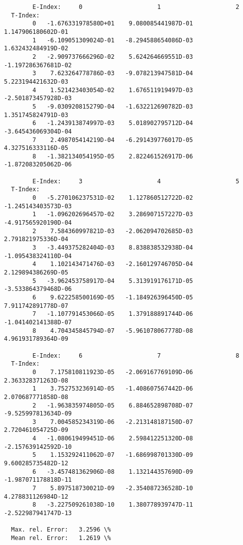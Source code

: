 \documentclass[12pt,dvipdfmx]{article}
\begin{document}
{\begin{small}\begin{verbatim}
        E-Index:     0                     1                     2
  T-Index:
        0   -1.676331978580D+01    9.080085441987D-01    1.147906180602D-01
        1   -6.109051309024D-01   -8.294588654086D-03    1.632432484919D-02
        2   -2.909737666296D-02    5.624264669551D-03   -1.197286367681D-02
        3    7.623264778786D-03   -9.078213947581D-04    5.223194421632D-03
        4    1.521423403054D-02    1.676511919497D-03   -2.501873457928D-03
        5   -9.030920815279D-04   -1.632212690782D-03    1.351745824791D-03
        6   -1.243913874997D-03    5.018902795712D-04   -3.645436069304D-04
        7    2.498705414219D-04   -6.291439776017D-05    4.327516333116D-05
        8   -1.382134054195D-05    2.822461526917D-06   -1.872083205062D-06

        E-Index:     3                     4                     5
  T-Index:
        0   -5.270106237531D-02    1.127860512722D-02   -1.245143403573D-03
        1   -1.096202696457D-02    3.286907157227D-03   -4.917565920190D-04
        2    7.584360997821D-03   -2.062094702685D-03    2.791821975336D-04
        3   -3.449375282404D-03    8.838838532938D-04   -1.095438324110D-04
        4    1.102143471476D-03   -2.160129746705D-04    2.129894386269D-05
        5   -3.962453758917D-04    5.313919176171D-05   -3.533864379468D-06
        6    9.622258500169D-05   -1.184926396450D-05    7.911742891778D-07
        7   -1.107791453066D-05    1.379188891744D-06   -1.041402141388D-07
        8    4.704345845794D-07   -5.961078067778D-08    4.961931789364D-09

        E-Index:     6                     7                     8
  T-Index:
        0    7.175810811923D-05   -2.069167769109D-06    2.363328371263D-08
        1    3.752753236914D-05   -1.408607567442D-06    2.070687771858D-08
        2   -1.963835974805D-05    6.884652898708D-07   -9.525997813634D-09
        3    7.004585234319D-06   -2.213148187150D-07    2.720461054725D-09
        4   -1.080619499451D-06    2.598412251320D-08   -2.157639142592D-10
        5    1.153292411062D-07   -1.686998701330D-09    9.600285735482D-12
        6   -3.457481362906D-08    1.132144357690D-09   -1.987071178818D-11
        7    5.897518730021D-09   -2.354087236528D-10    4.278831126984D-12
        8   -3.227509261038D-10    1.380778939747D-11   -2.522987941747D-13

  Max. rel. Error:   3.2596 \%
  Mean rel. Error:   1.2619 \%


\end{verbatim}
\end{small}}
\end{document}
